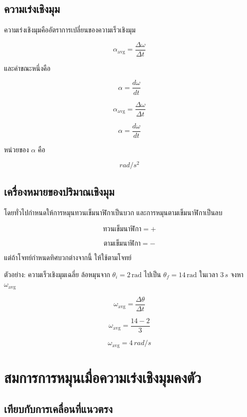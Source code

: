 \subsection{ความเร่งเชิงมุม}

ความเร่งเชิงมุมคืออัตราการเปลี่ยนของความเร็วเชิงมุม

\[
\alpha_{\text{avg}}=\frac{\Delta \omega}{\Delta t}
\]

และค่าขณะหนึ่งคือ

\[
\alpha=\frac{d\omega}{dt}
\]

\begin{tcolorbox}[title=ความเร่งเชิงมุม]
\[
\alpha_{\text{avg}}=\frac{\Delta \omega}{\Delta t}
\]

\[
\alpha=\frac{d\omega}{dt}
\]
\end{tcolorbox}

หน่วยของ $\alpha$ คือ

\[
\si{rad/s^2}
\]

\subsection{เครื่องหมายของปริมาณเชิงมุม}

โดยทั่วไปกำหนดให้การหมุนทวนเข็มนาฬิกาเป็นบวก และการหมุนตามเข็มนาฬิกาเป็นลบ

\[
\text{ทวนเข็มนาฬิกา} = +
\]

\[
\text{ตามเข็มนาฬิกา} = -
\]

แต่ถ้าโจทย์กำหนดทิศบวกต่างจากนี้ ให้ใช้ตามโจทย์

\begin{examplebox}{ตัวอย่าง: ความเร็วเชิงมุมเฉลี่ย}
ล้อหมุนจาก $\theta_i=2\,\text{rad}$ ไปเป็น $\theta_f=14\,\text{rad}$ ในเวลา $3\,\si{s}$ จงหา $\omega_{\text{avg}}$

\[
\omega_{\text{avg}}=\frac{\Delta \theta}{\Delta t}
\]

\[
\omega_{\text{avg}}=\frac{14-2}{3}
\]

\[
\boxed{\omega_{\text{avg}}=4\,\si{rad/s}}
\]
\end{examplebox}

\section{สมการการหมุนเมื่อความเร่งเชิงมุมคงตัว}

\subsection{เทียบกับการเคลื่อนที่แนวตรง}

